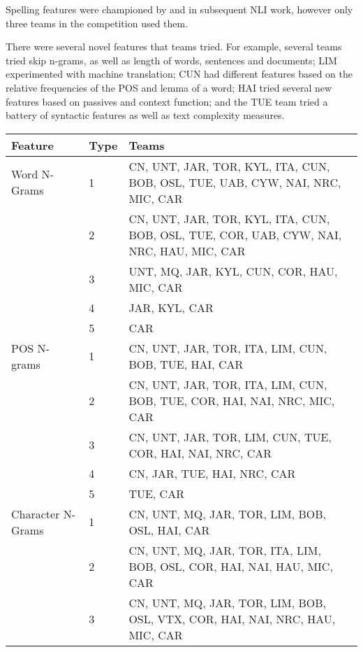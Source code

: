 \documentclass[11pt,letterpaper]{article}
\begin{document}
Spelling features were championed by 
and in subsequent NLI work, however only three teams in the competition used them.

There were several novel features that teams tried.  For example,
several teams tried skip n-grams, as well as length of words, sentences
and documents; LIM
experimented with machine translation; CUN had different features
based on the relative frequencies of the POS and lemma of a word;
HAI tried several new features based on passives and context function;
and the TUE team tried a battery of syntactic features as well as
text complexity measures.



\begin{table*}[!ht]
\begin{center}
\begin{small}
\begin{tabular}{|l|l|p{9.5cm}|}
\hline
{\bf Feature} & {\bf Type} & {\bf Teams} \\  \hline
Word N-Grams       & 1      & CN, UNT, JAR, TOR, KYL, ITA, CUN, BOB, OSL, TUE, UAB, CYW, NAI, NRC, MIC, CAR   \\ \hline
		   & 2      & CN, UNT, JAR, TOR, KYL, ITA, CUN, BOB, OSL, TUE, COR, UAB, CYW, NAI, NRC, HAU, MIC, CAR \\ \hline
                   & 3      & UNT, MQ, JAR, KYL, CUN, COR, HAU, MIC, CAR  \\ \hline
                   & 4      & JAR, KYL, CAR   \\ \hline
		   & 5      & CAR \\ \hline
POS N-grams        & 1      & CN, UNT, JAR, TOR, ITA, LIM, CUN, BOB, TUE, HAI, CAR  \\ \hline
		   & 2      & CN, UNT, JAR, TOR, ITA, LIM, CUN, BOB, TUE, COR, HAI, NAI, NRC, MIC, CAR   \\ \hline
                   & 3      & CN, UNT, JAR, TOR, LIM, CUN, TUE, COR, HAI, NAI, NRC, CAR     \\ \hline
                   & 4      & CN, JAR, TUE, HAI, NRC, CAR    \\ \hline
                   & 5      & TUE, CAR \\ \hline
Character N-Grams  & 1      & CN, UNT, MQ, JAR, TOR, LIM, BOB, OSL, HAI, CAR  \\ \hline
                   & 2      & CN, UNT, MQ, JAR, TOR, ITA, LIM, BOB, OSL, COR, HAI, NAI, HAU, MIC, CAR  \\ \hline
                   & 3      & CN, UNT, MQ, JAR, TOR, LIM, BOB, OSL, VTX, COR, HAI, NAI, NRC, HAU, MIC, CAR \\ \hline

\end{tabular}
\end{small}
\end{center}
\end{table*}
\end{document}
